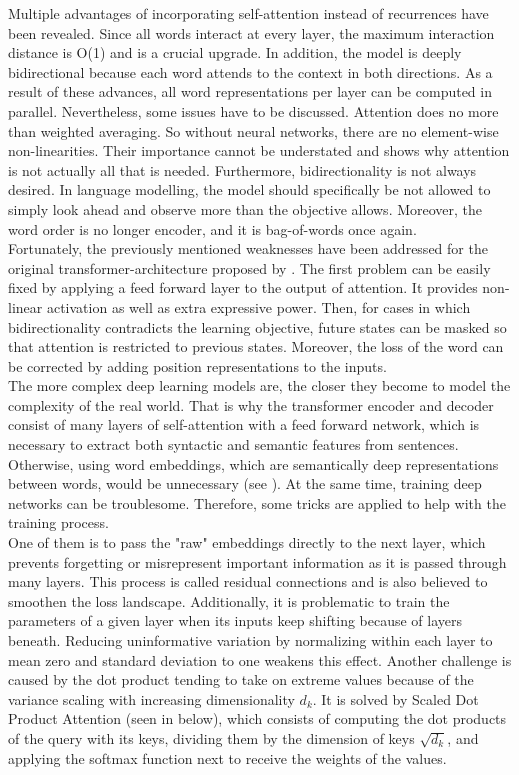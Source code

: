 \documentclass[
]{krantz}
\begin{document}
Multiple advantages of incorporating self-attention instead of
recurrences have been revealed. Since all words interact at every layer,
the maximum interaction distance is O(1) and is a crucial upgrade. In
addition, the model is deeply bidirectional because each word attends to
the context in both directions. As a result of these advances, all word
representations per layer can be computed in parallel. Nevertheless,
some issues have to be discussed. Attention does no more than weighted
averaging. So without neural networks, there are no element-wise
non-linearities. Their importance cannot be understated and shows why
attention is not actually all that is needed. Furthermore,
bidirectionality is not always desired. In language modelling, the model
should specifically be not allowed to simply look ahead and observe more
than the objective allows. Moreover, the word order is no longer
encoder, and it is bag-of-words once again.\\
Fortunately, the previously mentioned weaknesses have been addressed for
the original transformer-architecture proposed by \citep{vaswani2017attention}. The
first problem can be easily fixed by applying a feed forward layer to
the output of attention. It provides non-linear activation as well as
extra expressive power. Then, for cases in which bidirectionality
contradicts the learning objective, future states can be masked so that
attention is restricted to previous states. Moreover, the loss of the
word can be corrected by adding position representations to the inputs.\\
The more complex deep learning models are, the closer they become to
model the complexity of the real world. That is why the transformer
encoder and decoder consist of many layers of self-attention with a feed
forward network, which is necessary to extract both syntactic and
semantic features from sentences. Otherwise, using word embeddings,
which are semantically deep representations between words, would be
unnecessary (see \citep{Sejnowski2020}). At the same time, training deep
networks can be troublesome. Therefore, some tricks are applied to help
with the training process.\\
One of them is to pass the "raw" embeddings directly to the next
layer, which prevents forgetting or misrepresent important information
as it is passed through many layers. This process is called residual
connections and is also believed to smoothen the loss landscape.
Additionally, it is problematic to train the parameters of a given layer
when its inputs keep shifting because of layers beneath. Reducing
uninformative variation by normalizing within each layer to mean zero
and standard deviation to one weakens this effect. Another challenge is
caused by the dot product tending to take on extreme values because of
the variance scaling with increasing dimensionality \(d_k\). It is solved
by Scaled Dot Product Attention (seen in below), which consists of
computing the dot products of the query with its keys, dividing them by
the dimension of keys \(\sqrt{d_k}\), and applying the softmax function
next to receive the weights of the values.
\end{document}
